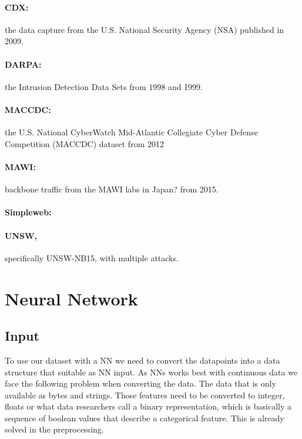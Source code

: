\documentclass[
	ngerman,
	ruledheaders=section,%
	class=report,%
	thesis={type=bachelor},%
	accentcolor=9c,%
	custommargins=true,%
	marginpar=false,%
	parskip=half-,%
	fontsize=11pt,%
]{tudapub}
\begin{document}
\paragraph{CDX:} the data capture from the U.S. National Security Agency (NSA) published in 2009.

\paragraph{DARPA:} the Intrusion Detection Data Sets from 1998 and 1999.

\paragraph{MACCDC:} the U.S. National CyberWatch Mid-Atlantic Collegiate Cyber Defense Competition (MACCDC) dataset from 2012

\paragraph{MAWI:} backbone traffic from the MAWI labs in Japan? from 2015.

\paragraph{Simpleweb:}

\paragraph{UNSW,} specifically UNSW-NB15, with multiple attacks.

\section{Neural Network}

\subsection{Input}

To use our dataset with a NN we need to convert the datapoints into a data structure that suitable as NN input.
As NNs works best with continuous data we face the following problem when converting the data.
The data that is only available as bytes and strings.
Those features need to be converted to integer, floats or what data researchers call a binary representation, which is basically a sequence of boolean values that describe a categorical feature.
This is already solved in the preprocessing.
\end{document}
